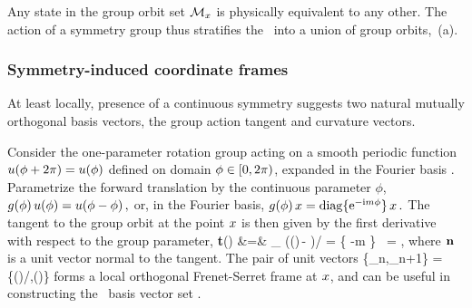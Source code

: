 Any state in the  group orbit set ${\cal M}_{x}$
is physically equivalent to any other. The action of a symmetry group
thus stratifies the \statesp\ into a union of group orbits,
\,{(a)}.

\subsubsection{Symmetry-induced coordinate frames}
\label{s:symmIndCoo}

At least locally, presence of a continuous symmetry suggests two
natural mutually orthogonal basis vectors, the group action tangent and
curvature vectors.

Consider the one-parameter rotation group  acting on a smooth
periodic function $u({\bf \phi} + 2\pi) = u({\bf \phi})$ defined on domain
${\bf \phi} \in [0,2\pi)$, expanded in the Fourier basis
.
Parametrize the forward
translation by the continuous parameter $\phi$,
\(
    g(\phi)\,u({\bf \phi}) = u({\bf \phi}-\phi)
\,,
\)
or, in the Fourier basis,
\(
   g(\phi) \,x = \mathrm{diag}\{ \mathrm{e}^{-\mathrm{i}m\phi} \} \,x
\,.
\)
The tangent to the group orbit at the point $\ssp$ is then given by
the first derivative with respect to the group parameter,
\bea
   {\bf t}(\ssp) &=&
   \lim_{\gSpace{}}
   \left(\LieEl(\gSpace)\,\ssp - \ssp\right)/\gSpace
   = \{ -m \} \, \ssp = \Lg \ssp,
\label{eq:tang}
\eea
where $\mathbf{n}$ is a unit vector normal to the tangent. The pair of unit vectors
    \PC{2011-10-28
    ``As $\Norm{\LieEl(\gSpace)\slicep}$ is a constant, for the group tangent
    vector $\Lg_\gSpace \slicep$ evaluated at $\slicep$ \refeq{eq:tang}
    $\braket{\slicep}{\Lg_\theta\,\slicep}$ vanishes ($\Lg_{\theta}$ is
    antisymmetric).''
The state vector $\ssp$ is not normal to \normVec(\ssp), as $\braket{\ssp
\Lg^2}{\ssp} = - \Norm{\groupTan(\ssp)}^2 \neq 0$, but can one use it to
produce from $\ssp$ the 3. local eigenbasis unit vector? Have not thought
that through. If we do that here, need to rewrite text leading to
\refeq{PCsectQ0}.
    }
\beq
\{{\be_n},{\be_{n+1}}\} =
\{\groupTan(\ssp)/\Norm{\groupTan(\ssp)},\normVec(\ssp)\}
forms a local orthogonal Frenet-Serret frame at $\ssp$, and can be useful
in constructing the \statesp\ basis vector set .

